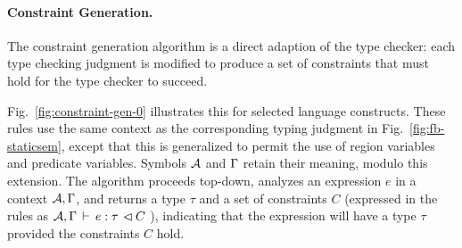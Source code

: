 %
%



\paragraph{Constraint Generation.}
The constraint generation algorithm is a direct adaption of the type checker:
each type checking judgment is modified to produce a set of constraints that must hold
for the type checker to succeed.

Fig.~\ref{fig:constraint-gen-0} illustrates this for selected language constructs.
These rules use the same context as the corresponding typing judgment in
Fig.~\ref{fig:fb-staticsem}, except that this is generalized to permit the
use of region variables and predicate variables.
Symbols ${\mathcal{A}}$ and $\Gamma$ retain their meaning, modulo this extension.
The algorithm proceeds top-down, analyzes an expression $e$ in a context
${\mathcal{A}},\Gamma$, and returns a type $\tau$ and a set of constraints $C$
(expressed in the rules as ${{\mathcal{A}},\Gamma} \, \vdash \, {e} : {\tau} \, \lhd {C}$ ),
indicating that the expression will have a type $\tau$ provided the constraints $C$ hold.


